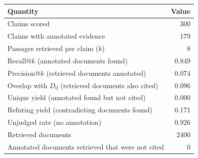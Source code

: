 \begin{tabular}{lr}
\toprule
Quantity & Value \\
\midrule
Claims scored & 300 \\
Claims with annotated evidence & 179 \\
Passages retrieved per claim ($k$) & 8 \\
Recall@$k$ (annotated documents found) & 0.849 \\
Precision@$k$ (retrieved documents annotated) & 0.074 \\
Overlap with $D_0$ (retrieved documents also cited) & 0.096 \\
Unique yield (annotated found but not cited) & 0.000 \\
Refuting yield (contradicting documents found) & 0.171 \\
Unjudged rate (no annotation) & 0.926 \\
Retrieved documents & 2400 \\
Annotated documents retrieved that were not cited & 0 \\
\bottomrule
\end{tabular}

